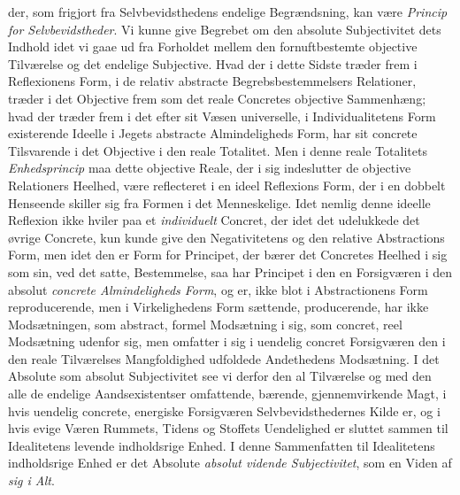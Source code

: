 der, som frigjort fra Selvbevidsthedens endelige Begrændsning, kan være
\emph{Princip for Selvbevidstheder}. Vi kunne give Begrebet om den absolute
Subjectivitet dets Indhold idet vi gaae ud fra Forholdet mellem den
fornuftbestemte objective Tilværelse og det endelige Subjective. Hvad der i
dette Sidste træder frem i Reflexionens Form, i de relativ abstracte
Begrebsbestemmelsers Relationer, træder i det Objective frem som det reale
Concretes objective Sammenhæng; hvad der træder frem i det efter sit Væsen
universelle, i Individualitetens Form existerende Ideelle i Jegets abstracte
Almindeligheds Form, har sit concrete Tilsvarende i det Objective i den reale
Totalitet. Men i denne reale Totalitets \emph{Enhedsprincip} maa dette
objective Reale, der i sig indeslutter de objective Relationers Heelhed, være
reflecteret i en ideel Reflexions Form, der i en dobbelt Henseende skiller sig
fra Formen i det Menneskelige. Idet nemlig denne ideelle Reflexion ikke hviler
paa et \emph{individuelt} Concret, der idet det udelukkede det øvrige
Concrete, kun kunde give den Negativitetens og den relative Abstractions
 Form, men idet den er Form for Principet, der bærer det Concretes Heelhed i
sig som sin, ved det satte, Bestemmelse, saa har Principet i den en
Forsigværen i den absolut \emph{concrete Almindeligheds Form}, og er, ikke
blot i Abstractionens Form reproducerende, men i Virkelighedens Form sættende,
producerende, har ikke Modsætningen, som abstract, formel Modsætning i sig,
som concret, reel Modsætning udenfor sig, men omfatter i sig i uendelig
concret Forsigværen den i den reale Tilværelses Mangfoldighed udfoldede
Andethedens Modsætning. I det Absolute som absolut Subjectivitet see vi derfor
den al Tilværelse og med den alle de endelige Aandsexistentser omfattende,
bærende, gjennemvirkende Magt, i hvis uendelig concrete, energiske
Forsigværen Selvbevidsthedernes Kilde er, og i hvis evige Væren Rummets,
Tidens og Stoffets Uendelighed er sluttet sammen til Idealitetens levende
indholdsrige Enhed. I denne Sammenfatten til Idealitetens indholdsrige Enhed
er det Absolute \emph{absolut vidende Subjectivitet}, som en Viden af
\emph{sig i Alt}.

